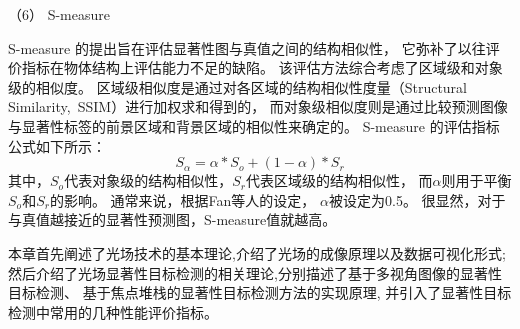 （6）
S-measure\par
%
%
%
S-measure 的提出旨在评估显著性图与真值之间的结构相似性，
它弥补了以往评价指标在物体结构上评估能力不足的缺陷。
该评估方法综合考虑了区域级和对象级的相似度。
区域级相似度是通过对各区域的结构相似性度量（Structural Similarity,~SSIM）进行加权求和得到的，
而对象级相似度则是通过比较预测图像与显著性标签的前景区域和背景区域的相似性来确定的。
S-measure 的评估指标公式如下所示：
\begin{equation}
	S_{\alpha} = \alpha * S_{o} + \left ( 1 - \alpha  \right )*S_{r} 
\end{equation}
%
%
其中，$S_{o}$代表对象级的结构相似性，$S_{r}$代表区域级的结构相似性，
而$\alpha$则用于平衡$S_{o}$和$S_{r}$的影响。
通常来说，根据Fan等人的设定，
$\alpha$被设定为0.5。
很显然，对于与真值越接近的显著性预测图，S-measure值就越高。
%
%





本章首先阐述了光场技术的基本理论,介绍了光场的成像原理以及数据可视化形式;
然后介绍了光场显著性目标检测的相关理论,分别描述了基于多视角图像的显著性目标检测、
基于焦点堆栈的显著性目标检测方法的实现原理,
并引入了显著性目标检测中常用的几种性能评价指标。